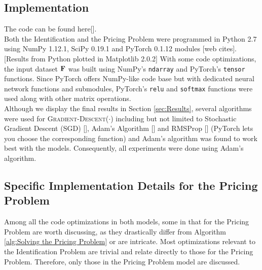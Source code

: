\begin{appendices}
    \section{Implementation} \label{sec:Implementation}
    The code can be found here[]. \\
    Both the Identification and the Pricing Problem were programmed in Python 2.7 using NumPy 1.12.1, SciPy 0.19.1 and PyTorch 0.1.12 modules [web cites]. [Results from Python plotted in Matplotlib 2.0.2] With some code optimizations, the input dataset $\mathbf{F}$ was built using NumPy's \texttt{ndarray} and PyTorch's \texttt{tensor} functions. Since PyTorch offers NumPy-like code base but with dedicated neural network functions and submodules, PyTorch's \texttt{relu} and \texttt{softmax} functions were used along with other matrix operations.\\
    
    Although we display the final results in Section \ref{sec:Results}, several algorithms were used for \textsc{Gradient-Descent}($\cdot$) including but not limited to Stochastic Gradient Descent (SGD) [], Adam's Algorithm [] and RMSProp [] (PyTorch lets you choose the corresponding function) and Adam's algorithm was found to work best with the models. Consequently, all experiments were done using Adam's algorithm.
    
    \subsection{Specific Implementation Details for the Pricing Problem}
    Among all the code optimizations in both models, some in that for the Pricing Problem are worth discussing, as they drastically differ from Algorithm \ref{alg:Solving the Pricing Problem} or are intricate. Most optimizations relevant to the Identification Problem are trivial and relate directly to those for the Pricing Problem. Therefore, only those in the Pricing Problem model are discussed.
    

\end{appendices}
